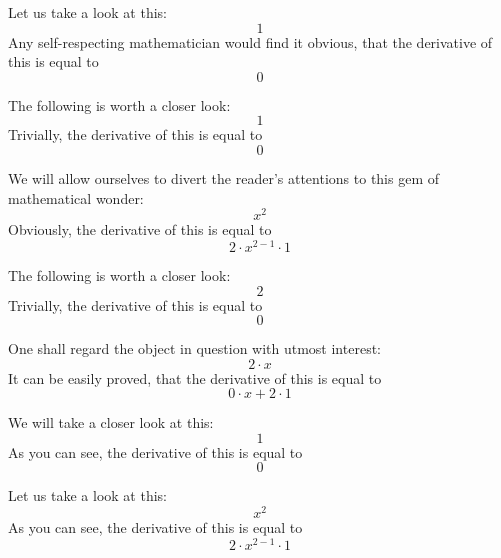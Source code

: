 \documentclass{article}
\begin{document}
Let us take a look at this:
\begin{equation}
1 
\end{equation}
Any self-respecting mathematician would find it obvious, that the derivative of this is equal to
\begin{equation}
0 
\end{equation}

The following is worth a closer look:
\begin{equation}
1 
\end{equation}
Trivially, the derivative of this is equal to
\begin{equation}
0 
\end{equation}

We will allow ourselves to divert the reader's attentions to this gem of mathematical wonder:
\begin{equation}
x ^{2 } 
\end{equation}
Obviously, the derivative of this is equal to
\begin{equation}
2 \cdot x ^{2 - 1 } \cdot 1 
\end{equation}

The following is worth a closer look:
\begin{equation}
2 
\end{equation}
Trivially, the derivative of this is equal to
\begin{equation}
0 
\end{equation}

One shall regard the object in question with utmost interest:
\begin{equation}
2 \cdot x 
\end{equation}
It can be easily proved, that the derivative of this is equal to
\begin{equation}
0 \cdot x + 2 \cdot 1 
\end{equation}

We will take a closer look at this:
\begin{equation}
1 
\end{equation}
As you can see, the derivative of this is equal to
\begin{equation}
0 
\end{equation}

Let us take a look at this:
\begin{equation}
x ^{2 } 
\end{equation}
As you can see, the derivative of this is equal to
\begin{equation}
2 \cdot x ^{2 - 1 } \cdot 1 
\end{equation}
\end{document}
